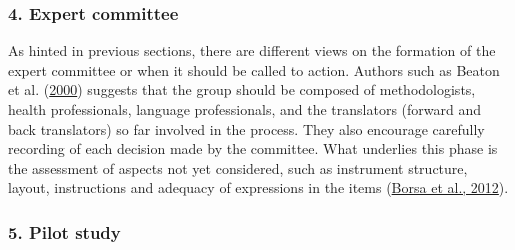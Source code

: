 \documentclass[
  ,doc,11pt, twoside,floatsintext]{apa6}
\begin{document}
\hypertarget{expert-committee}{%
\subsubsection{4. Expert committee}\label{expert-committee}}

As hinted in previous sections, there are different views on the formation of the expert committee or when it should be called to action. Authors such as Beaton et al. (\protect\hyperlink{ref-beaton2000}{2000}) suggests that the group should be composed of methodologists, health professionals, language professionals, and the translators (forward and back translators) so far involved in the process. They also encourage carefully recording of each decision made by the committee. What underlies this phase is the assessment of aspects not yet considered, such as instrument structure, layout, instructions and adequacy of expressions in the items (\protect\hyperlink{ref-borsaAdaptacaoValidacaoInstrumentos2012}{Borsa et al., 2012}).

\hypertarget{pilot-study}{%
\subsubsection{5. Pilot study}\label{pilot-study}}
\end{document}
